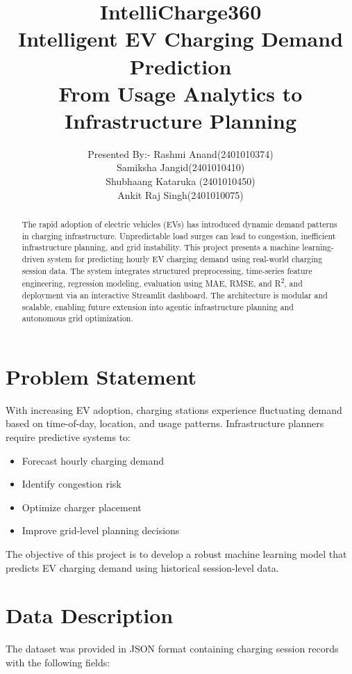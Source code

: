 \documentclass[12pt,a4paper]{article}
\title{\textbf{IntelliCharge360\\
Intelligent EV Charging Demand Prediction\\
\large  From Usage Analytics to Infrastructure Planning}}
\author{Presented By:-
Rashmi Anand(2401010374)\\
Samiksha Jangid(2401010410)\\
Shubhaang Kataruka (2401010450)\\
Ankit Raj Singh(2401010075)}
\date{}
\begin{document}
\maketitle



\begin{abstract}
The rapid adoption of electric vehicles (EVs) has introduced dynamic demand patterns in charging infrastructure. 
Unpredictable load surges can lead to congestion, inefficient infrastructure planning, and grid instability. 
This project presents a machine learning-driven system for predicting hourly EV charging demand using real-world charging session data. 
The system integrates structured preprocessing, time-series feature engineering, regression modeling, evaluation using MAE, RMSE, and R\textsuperscript{2}, and deployment via an interactive Streamlit dashboard. 
The architecture is modular and scalable, enabling future extension into agentic infrastructure planning and autonomous grid optimization.
\end{abstract}



\section{Problem Statement}

With increasing EV adoption, charging stations experience fluctuating demand based on time-of-day, location, and usage patterns. 
Infrastructure planners require predictive systems to:

\begin{itemize}
    \item Forecast hourly charging demand
    \item Identify congestion risk
    \item Optimize charger placement
    \item Improve grid-level planning decisions
\end{itemize}

The objective of this project is to develop a robust machine learning model that predicts EV charging demand using historical session-level data.

\section{Data Description}

The dataset was provided in JSON format containing charging session records with the following fields:
\end{document}
